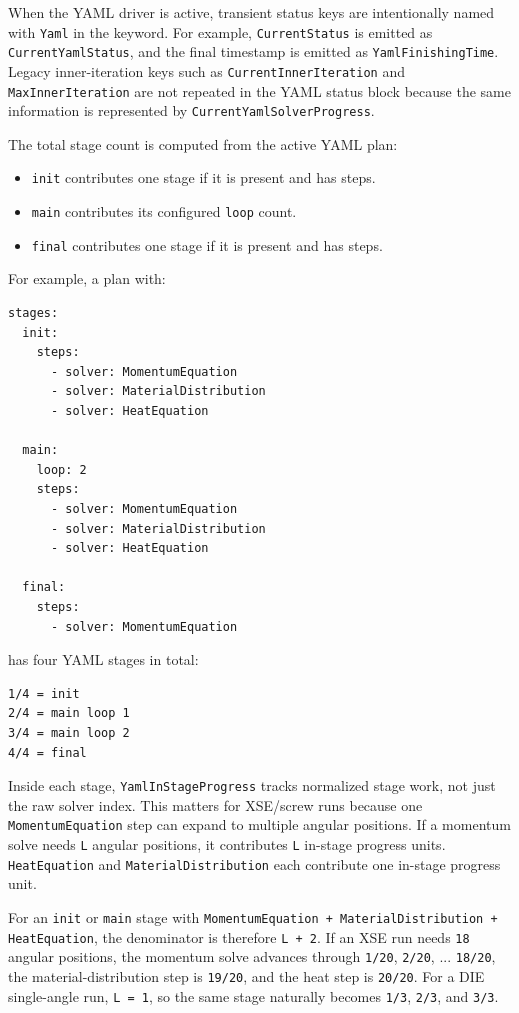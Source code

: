 \documentclass[11pt,a4paper]{article}
\begin{document}
When the YAML driver is active, transient status keys are intentionally named with \texttt{Yaml} in the keyword.
For example, \texttt{CurrentStatus} is emitted as \texttt{CurrentYamlStatus}, and the final timestamp is emitted as
\texttt{YamlFinishingTime}. Legacy inner-iteration keys such as \texttt{CurrentInnerIteration} and
\texttt{MaxInnerIteration} are not repeated in the YAML status block because the same information is represented by
\texttt{CurrentYamlSolverProgress}.

The total stage count is computed from the active YAML plan:

\begin{itemize}[leftmargin=*]
  \item \texttt{init} contributes one stage if it is present and has steps.
  \item \texttt{main} contributes its configured \texttt{loop} count.
  \item \texttt{final} contributes one stage if it is present and has steps.
\end{itemize}

For example, a plan with:

\begin{verbatim}
stages:
  init:
    steps:
      - solver: MomentumEquation
      - solver: MaterialDistribution
      - solver: HeatEquation

  main:
    loop: 2
    steps:
      - solver: MomentumEquation
      - solver: MaterialDistribution
      - solver: HeatEquation

  final:
    steps:
      - solver: MomentumEquation
\end{verbatim}

has four YAML stages in total:

\begin{verbatim}
1/4 = init
2/4 = main loop 1
3/4 = main loop 2
4/4 = final
\end{verbatim}

Inside each stage, \texttt{YamlInStageProgress} tracks normalized stage work, not just the raw solver index. This
matters for XSE/screw runs because one \texttt{MomentumEquation} step can expand to multiple angular positions. If
a momentum solve needs \texttt{L} angular positions, it contributes \texttt{L} in-stage progress units.
\texttt{HeatEquation} and \texttt{MaterialDistribution} each contribute one in-stage progress unit.

For an \texttt{init} or \texttt{main} stage with
\texttt{MomentumEquation + MaterialDistribution + HeatEquation}, the denominator is therefore \texttt{L + 2}. If an
XSE run needs \texttt{18} angular positions, the momentum solve advances through \texttt{1/20}, \texttt{2/20}, ...
\texttt{18/20}, the material-distribution step is \texttt{19/20}, and the heat step is \texttt{20/20}. For a DIE
single-angle run, \texttt{L = 1}, so the same stage naturally becomes \texttt{1/3}, \texttt{2/3}, and
\texttt{3/3}.
\end{document}
